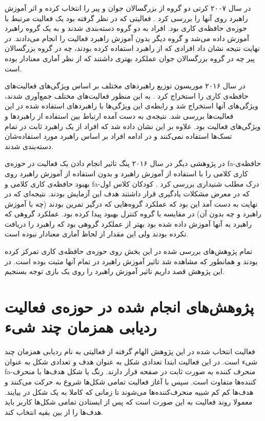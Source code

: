 \documentclass[twoside, a4paper,11pt]{book}
\numberwithin{equation}{chapter}
\numberwithin{table}{chapter}
\numberwithin{figure}{chapter}
\numberwithin{equation}{chapter}
\newcommand{\mls}[1]{\gls{fa-#1}\glsuseri{la-#1}}
\begin{document}
در سال ۲۰۰۷ کرتی دو گروه از بزرگسالان جوان و پیر را انتخاب کرده و اثر آموزش راهبرد روی آنها را بررسی کرد \cite{carretti2007StaMem}. فعالیتی که در نظر گرفته بود یک فعالیت مرتبط با حوزه‌ی حافظه‌ی کاری بود. افراد به دو گروه دسته‌بندی شدند و به یک گروه راهبرد آموزش داده می‌شد و گروه دیگر بدون آموزش راهبرد فعالیت را انجام می‌دادند. در نهایت نتیجه نشان داد افرادی که از راهبرد استفاده کرده بودند، چه در گروه بزرگسالان پیر چه در گروه بزرگسالان جوان عملکرد بهتری داشتند که از نظر آماری معنادار بوده است.

در سال ۲۰۱۶ موریسون توزیع راهبرد‌های مختلف بر اساس ویژگی‌های فعالیت‌های حافظه‌ی کاری را استخراج کرد \cite{morrison2016variation}. به این منظور فعالیت‌های مختلف جمع‌آوری شدند، ویژگی‌های آنها استخراج شد و رابطه‌ی این ویژگی‌ها با راهبرد‌های استفاده شده در این فعالیت‌ها بررسی شد. نتیجه‌ی به دست آمده ارتباط بین استفاده از راهبرد‌ها و ویژگی‌های فعالیت بود. علاوه بر این نشان داده شد که افراد از یک راهبرد ثابت در تمام تسک‌ها استفاده نمی‌کنند و در ادامه افراد بر اساس راهبرد مورد استفاده‌شان دسته‌بندی شدند.

در پژوهشی دیگر در سال ۲۰۱۶ پنگ تاثیر انجام دادن یک فعالیت در حوزه‌ی \mls{حافظه‌ی کاری کلامی} را با استفاده از آموزش راهبرد و بدون استفاده از آموزش راهبرد روی بهبود حافظه‌ی کاری کلامی و \mls{درک مطلب شنیداری} بررسی کرد \cite{peng2016WMTrain}. کودکان کلاس اول که در معرض مشکلات یادگیری قرار داشتند هدف این آزمایش بودند. نتیجه‌ای که در نهایت به دست آمد این بود که عملکرد گروه‌هایی که درگیر تمرین بودند (چه با آموزش راهبرد و چه بدون آن) در مقایسه با گروه کنترل بهبود پیدا کرده بود. عملکرد گروهی که راهبرد به آنها آموزش داده شده بود بهتر از عملکرد گروهی بود که راهبرد را دریافت نکرده بودند ولی این مقدار از لحاظ آماری معنادار نبوده است. 

تمام پژوهش‌های بررسی شده در این بخش روی حوزه‌ی حافظه‌ی کاری تمرکز کرده بودند و همانطور که مشاهده شد تاثیر آموزش راهبرد در تمام آنها مثبت بوده است. در این پژوهش قصد داریم تاثیر آموزش راهبرد را روی یک بازی توجه بسنجیم.

\section{پژوهش‌های انجام شده در حوزه‌ی فعالیت ردیابی همزمان چند شیء}
فعالیت انتخاب شده در این پژوهش الهام گرفته از فعالیتی به نام ردیابی همزمان چند شیء است. در این فعالیت ابتدا تعدادی شکل به عنوان هدف و تعدادی شکل به عنوان \mls{منحرف کننده} به صورت ثابت در صفحه قرار دارند. رنگ یا شکل هدف‌ها با منحرف کننده‌ها متفاوت است. سپس با آغاز فعالیت تمامی شکل‌ها شروع به حرکت می‌کنند و هدف‌ها کم کم شبیه منحرف‌کننده‌ها می‌شوند تا زمانی که کاملا به یک شکل در بیایند. معمولا روند فعالیت به این صورت است که پس از ایستادن تمامی شکل‌ها کاربر باید هدف‌ها را از بین بقیه انتخاب کند.
\end{document}
